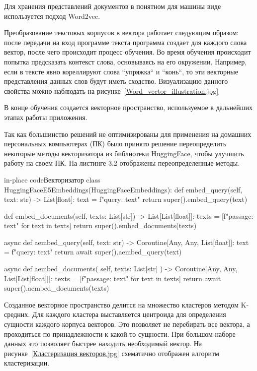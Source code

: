
Для хранения представлений документов в понятном для машины виде используется
подход Word2vec.

Преобразование текстовых корпусов в вектора работает следующим образом:
после передачи на вход программе текста программа создает для каждого слова
вектор, после чего происходит процесс обучения. Во время обучения происходит
попытка предсказать контекст слова, основываясь на его окружении. Например,
если в тексте явно кореллируют слова ``упряжка`` и ``конь``, то эти векторные
представления данных слов будут иметь сходство. Визуализацию данного свойства
можно наблюдать на рисунке~\ref{Word_vector_illustration.jpg}


В конце обучения создается векторное пространство, используемое в дальнейших
этапах работы приложения.

Так как большинство решений не оптимизированы для применения на домашних
персональных компьютерах (ПК) было принято решение переопределить некоторые методы
векторизатора из библиотеки HuggingFace, чтобы улучшить работу на своем ПК.
На листинге 3.2 отображены переопределенные методы.

\begin{codepiece}{in-place code}{Векторизатор}
    class HuggingFaceE5Embeddings(HuggingFaceEmbeddings):
        def embed_query(self, text: str) -> List[float]:
            text = f"query: {text}"
            return super().embed_query(text)
    
        def embed_documents(self, texts: List[str]) -> List[List[float]]:
            texts = [f"passage: {text}" for text in texts]
            return super().embed_documents(texts)
    
        async def aembed_query(self, text: str) -> Coroutine[Any, Any, List[float]]:
            text = f"query: {text}"
            return await super().aembed_query(text)
    
        async def aembed_documents(
            self, texts: List[str]
        ) -> Coroutine[Any, Any, List[List[float]]]:
            texts = [f"passage: {text}" for text in texts]
            return await super().aembed_documents(texts)
\end{codepiece}


Созданное векторное пространство делится на множество кластеров
методом K-средних. Для каждого кластера выставляется центроида для
определения сущности каждого корпуса векторов. Это позволяет не перебирать все
вектора, а проходиться по принадлежности к какой-то сущности. При большом
наборе данных это позволяет быстрее находить необходимый вектор.
На рисунке~\ref{Кластеризация векторов.jpg} схематично отображен алгоритм
кластеризации.

